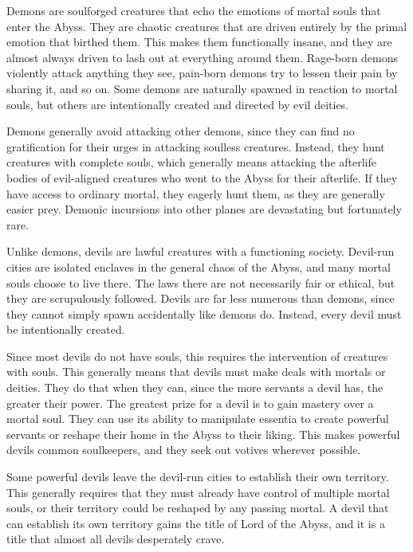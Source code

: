       Demons are soulforged creatures that echo the emotions of mortal souls that enter the Abyss.
      They are chaotic creatures that are driven entirely by the primal emotion that birthed them.
      This makes them functionally insane, and they are almost always driven to lash out at everything around them.
      Rage-born demons violently attack anything they see, pain-born demons try to lessen their pain by sharing it, and so on.
      Some demons are naturally spawned in reaction to mortal souls, but others are intentionally created and directed by evil deities.

      Demons generally avoid attacking other demons, since they can find no gratification for their urges in attacking soulless creatures.
      Instead, they hunt creatures with complete souls, which generally means attacking the afterlife bodies of evil-aligned creatures who went to the Abyss for their afterlife.
      If they have access to ordinary mortal, they eagerly hunt them, as they are generally easier prey.
      Demonic incursions into other planes are devastating but fortunately rare.

      Unlike demons, devils are lawful creatures with a functioning society.
      Devil-run cities are isolated enclaves in the general chaos of the Abyss, and many mortal souls choose to live there.
      The laws there are not necessarily fair or ethical, but they are scrupulously followed.
      Devils are far less numerous than demons, since they cannot simply spawn accidentally like demons do.
      Instead, every devil must be intentionally created.

      Since most devils do not have souls, this requires the intervention of creatures with souls.
      This generally means that devils must make deals with mortals or deities.
      They do that when they can, since the more servants a devil has, the greater their power.
      The greatest prize for a devil is to gain mastery over a mortal soul.
      They can use its ability to manipulate essentia to create powerful servants or reshape their home in the Abyss to their liking.
      This makes powerful devils common soulkeepers, and they seek out votives wherever possible.

      Some powerful devils leave the devil-run cities to establish their own territory.
      This generally requires that they must already have control of multiple mortal souls, or their territory could be reshaped by any passing mortal.
      A devil that can establish its own territory gains the title of Lord of the Abyss, and it is a title that almost all devils desperately crave.

